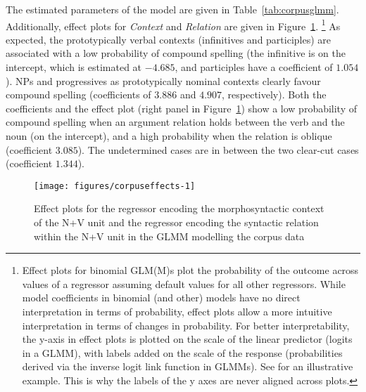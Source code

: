 \documentclass[biblatex, charis, linguex]{glossa}\usepackage{knitr}
\begin{document}
The estimated parameters of the model are given in Table~\ref{tab:corpusglmm}.
Additionally, effect plots for \textit{Context} and \textit{Relation} are given in Figure~\ref{fig:corpuseffects}.%
\footnote{Effect plots for binomial GLM(M)s \parencite{FoxWeisberg2018} plot the probability of the outcome across values of a regressor assuming default values for all other regressors.
While model coefficients in binomial (and other) models have no direct interpretation in terms of probability, effect plots allow a more intuitive interpretation in terms of changes in probability.
For better interpretability, the y-axis in effect plots is plotted on the scale of the linear predictor (logits in a GLMM), with labels added on the scale of the response (probabilities derived via the inverse logit link function in GLMMs).
See \citet[14]{FoxWeisberg2018} for an illustrative example.
This is why the labels of the y axes are never aligned across plots.}
As expected, the prototypically verbal contexts (infinitives and participles) are associated with a low probability of compound spelling (the infinitive is on the intercept, which is estimated at $-4.685$, and participles have a coefficient of $1.054$).
NPs and progressives as prototypically nominal contexts clearly favour compound spelling (coefficients of $3.886$ and $4.907$, respectively).
Both the coefficients and the effect plot (right panel in Figure~\ref{fig:corpuseffects}) show a low probability of compound spelling when an argument relation holds between the verb and the noun (on the intercept), and a high probability when the relation is oblique (coefficient $3.085$).
The undetermined cases are in between the two clear-cut cases (coefficient $1.344$).

\begin{figure}[!htbp]

{\centering \texttt{[image: figures/corpuseffects-1]} 

}

\caption[Effect plots for the regressor encoding the morphosyntactic context of the N+V unit and the regressor encoding the syntactic relation within the N+V unit in the GLMM modelling the corpus data]{Effect plots for the regressor encoding the morphosyntactic context of the N+V unit and the regressor encoding the syntactic relation within the N+V unit in the GLMM modelling the corpus data}\label{fig:corpuseffects}
\end{figure}
\end{document}
